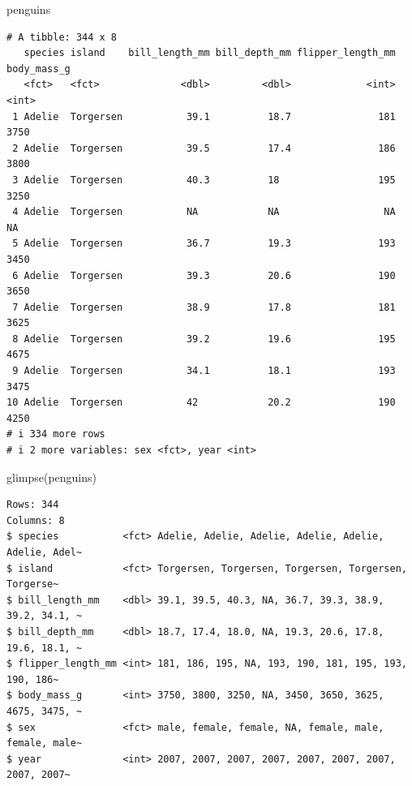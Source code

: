 \documentclass[
  letterpaper,
  DIV=11,
  numbers=noendperiod]{scrreprt}
\newenvironment{Shaded}{\begin{snugshade}}{\end{snugshade}}
\newcommand{\FunctionTok}[1]{\textcolor[rgb]{0.28,0.35,0.67}{#1}}
\newcommand{\NormalTok}[1]{\textcolor[rgb]{0.00,0.23,0.31}{#1}}
\begin{document}
\begin{Shaded}
\begin{Highlighting}[]
\NormalTok{penguins}
\end{Highlighting}
\end{Shaded}

\begin{verbatim}
# A tibble: 344 x 8
   species island    bill_length_mm bill_depth_mm flipper_length_mm body_mass_g
   <fct>   <fct>              <dbl>         <dbl>             <int>       <int>
 1 Adelie  Torgersen           39.1          18.7               181        3750
 2 Adelie  Torgersen           39.5          17.4               186        3800
 3 Adelie  Torgersen           40.3          18                 195        3250
 4 Adelie  Torgersen           NA            NA                  NA          NA
 5 Adelie  Torgersen           36.7          19.3               193        3450
 6 Adelie  Torgersen           39.3          20.6               190        3650
 7 Adelie  Torgersen           38.9          17.8               181        3625
 8 Adelie  Torgersen           39.2          19.6               195        4675
 9 Adelie  Torgersen           34.1          18.1               193        3475
10 Adelie  Torgersen           42            20.2               190        4250
# i 334 more rows
# i 2 more variables: sex <fct>, year <int>
\end{verbatim}

\begin{Shaded}
\begin{Highlighting}[]
\FunctionTok{glimpse}\NormalTok{(penguins)}
\end{Highlighting}
\end{Shaded}

\begin{verbatim}
Rows: 344
Columns: 8
$ species           <fct> Adelie, Adelie, Adelie, Adelie, Adelie, Adelie, Adel~
$ island            <fct> Torgersen, Torgersen, Torgersen, Torgersen, Torgerse~
$ bill_length_mm    <dbl> 39.1, 39.5, 40.3, NA, 36.7, 39.3, 38.9, 39.2, 34.1, ~
$ bill_depth_mm     <dbl> 18.7, 17.4, 18.0, NA, 19.3, 20.6, 17.8, 19.6, 18.1, ~
$ flipper_length_mm <int> 181, 186, 195, NA, 193, 190, 181, 195, 193, 190, 186~
$ body_mass_g       <int> 3750, 3800, 3250, NA, 3450, 3650, 3625, 4675, 3475, ~
$ sex               <fct> male, female, female, NA, female, male, female, male~
$ year              <int> 2007, 2007, 2007, 2007, 2007, 2007, 2007, 2007, 2007~
\end{verbatim}
\end{document}
